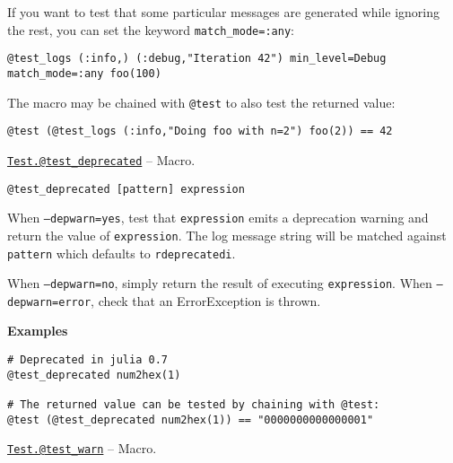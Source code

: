 \begin{adjustwidth}{2em}{0pt}
If you want to test that some particular messages are generated while ignoring the rest, you can set the keyword \texttt{match\_mode=:any}:


\begin{lstlisting}
@test_logs (:info,) (:debug,"Iteration 42") min_level=Debug match_mode=:any foo(100)
\end{lstlisting}

The macro may be chained with \texttt{@test} to also test the returned value:


\begin{lstlisting}
@test (@test_logs (:info,"Doing foo with n=2") foo(2)) == 42
\end{lstlisting}



\end{adjustwidth}
\hypertarget{3450176127005416215}{} 
\hyperlink{3450176127005416215}{\texttt{Test.@test\_deprecated}}  -- {Macro.}

\begin{adjustwidth}{2em}{0pt}


\begin{verbatim}
@test_deprecated [pattern] expression
\end{verbatim}

When \texttt{--depwarn=yes}, test that \texttt{expression} emits a deprecation warning and return the value of \texttt{expression}.  The log message string will be matched against \texttt{pattern} which defaults to \texttt{r{\textquotedbl}deprecated{\textquotedbl}i}.

When \texttt{--depwarn=no}, simply return the result of executing \texttt{expression}.  When \texttt{--depwarn=error}, check that an ErrorException is thrown.

\textbf{Examples}


\begin{lstlisting}
# Deprecated in julia 0.7
@test_deprecated num2hex(1)

# The returned value can be tested by chaining with @test:
@test (@test_deprecated num2hex(1)) == "0000000000000001"
\end{lstlisting}



\end{adjustwidth}
\hypertarget{12478857733960407392}{} 
\hyperlink{12478857733960407392}{\texttt{Test.@test\_warn}}  -- {Macro.}

